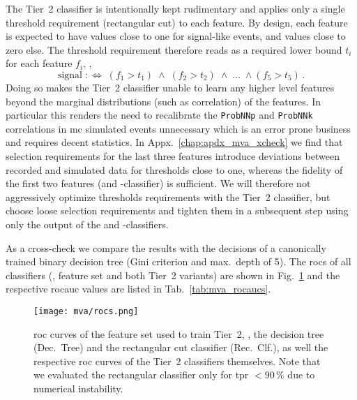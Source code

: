 The Tier~2 classifier is intentionally kept rudimentary and applies only a single threshold requirement (rectangular cut) to each feature.
By design, each feature is expected to have values close to one for signal-like events, and values close to zero else.
The threshold requirement therefore reads as a required lower bound $t_i$ for each feature $f_i$, \ie{},
\begin{equation*}
    \text{signal} \; :\Leftrightarrow \; (f_1 > t_1) \; \land \; (f_2 > t_2) \; \land \; \ldots \; \land (f_5 > t_5) \,.
\end{equation*}
Doing so makes the Tier~2 classifier unable to learn any higher level features beyond the marginal distributions (such as correlation) of the features.
In particular this renders the need to recalibrate the \texttt{ProbNNp} and \texttt{ProbNNk} correlations in \gls{mc} simulated events unnecessary which is an error prone business and requires decent statistics.
In Appx.~\ref{chap:apdx_mva_xcheck} we find that selection requirements for the last three features introduce deviations between recorded and simulated data for thresholds close to one, whereas the fidelity of the first two features (\Lz and \Lb-\Dz classifier) is sufficient.
We will therefore not aggressively optimize thresholds requirements with the Tier~2 classifier, but choose loose selection requirements and tighten them in a subsequent step using only the output of the \Lz and \Lb-\Dz classifiers.

As a cross-check we compare the results with the decisions of a canonically trained binary decision tree (Gini criterion and max.\ depth of 5).
The \glspl{roc} of all classifiers (\ie{}, feature set and both Tier~2 variants) are shown in Fig.~\ref{fig:mva_rocs} and the respective \gls{rocauc} values are listed in Tab.~\ref{tab:mva_rocaucs}.

\begin{figure}[htbp]
    \centering
    \texttt{[image: mva/rocs.png]}
    \caption{\Gls{roc} curves of the feature set used to train Tier~2, \ie{}, the decision tree (Dec.~Tree) and the rectangular cut classifier (Rec.\ Clf.), as well the respective \gls{roc} curves of the Tier~2 classifiers themselves. Note that we evaluated the rectangular classifier only for \gls{tpr} $< 90\,\%$ due to numerical instability.}
    \label{fig:mva_rocs}
\end{figure}

